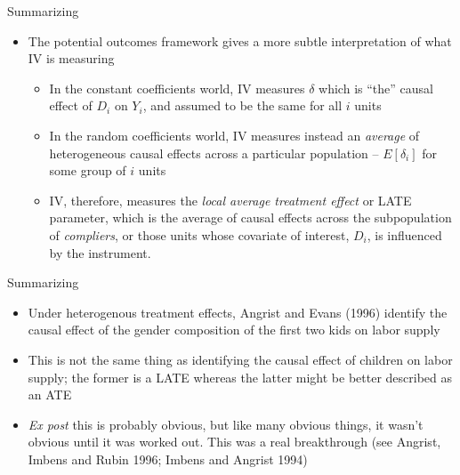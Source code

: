 \documentclass{beamer}
\begin{document}
\begin{frame}{Summarizing}

  \begin{itemize}
    \item The potential outcomes framework gives a more subtle interpretation of what IV is measuring
          \begin{itemize}
            \item In the constant coefficients world, IV measures $\delta$ which is ``the'' causal effect of $D_i$ on $Y_i$, and assumed to be the same for all $i$ units
            \item In the random coefficients world, IV measures instead an \emph{average} of heterogeneous causal effects across a particular population -- $E[\delta_i]$ for some group of $i$ units
            \item IV, therefore, measures the \emph{local average treatment effect} or LATE parameter, which is the average of causal effects across the subpopulation of \emph{compliers}, or those units whose covariate of interest, $D_i$, is influenced by the instrument.
          \end{itemize}
  \end{itemize}

\end{frame}

\begin{frame}{Summarizing}

  \begin{itemize}
    \item Under heterogenous treatment effects, Angrist and Evans (1996) identify the causal effect of the gender composition of the first two kids on labor supply
    \item This is not the same thing as identifying the causal effect of children on labor supply; the former is a LATE whereas the latter might be better described as an ATE
    \item \emph{Ex post} this is probably obvious, but like many obvious things, it wasn't obvious until it was worked out.  This was a real breakthrough (see Angrist, Imbens and Rubin 1996; Imbens and Angrist 1994)
  \end{itemize}

\end{frame}


\end{document}
